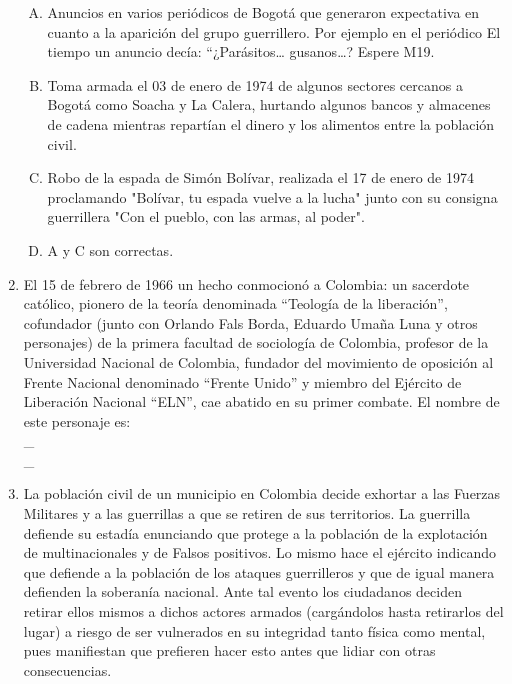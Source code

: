 \begin{enumerate}
\begin{enumerate}[(A)]
\item   Anuncios en varios periódicos de Bogotá que generaron expectativa en cuanto a la aparición del grupo guerrillero. Por ejemplo en el periódico El tiempo un anuncio decía: ``¿Parásitos… gusanos…? Espere M19.   
 \item  Toma armada el 03 de enero de 1974 de algunos sectores cercanos a Bogotá como Soacha y La Calera, hurtando algunos bancos y almacenes de cadena mientras repartían el dinero y los alimentos entre la población civil.
\item Robo de la espada de Simón Bolívar, realizada el 17 de enero de 1974 proclamando "Bolívar, tu espada vuelve a la lucha" junto con su consigna guerrillera "Con el pueblo, con las armas, al poder".
\item A y C son correctas.
\end{enumerate}



\item  El 15 de febrero de 1966 un hecho conmocionó a Colombia: un sacerdote católico, pionero de la teoría denominada ``Teología de la liberación'', cofundador (junto con Orlando Fals Borda, Eduardo Umaña Luna y otros personajes) de la primera facultad de sociología de Colombia, profesor de la Universidad Nacional de Colombia, fundador del movimiento de oposición al Frente Nacional denominado ``Frente Unido'' y miembro del Ejército de Liberación Nacional ``ELN'', cae abatido en su primer combate. El nombre de este personaje es:\label{sociii-11}
\hrulefill\\
\_\hrulefill\\
\_\hrulefill\\




\item La población civil de un municipio en Colombia decide exhortar a las Fuerzas Militares y a las guerrillas a que se retiren de sus territorios. La guerrilla defiende su estadía enunciando que protege a la población de la explotación de multinacionales y de Falsos positivos. Lo mismo hace el ejército indicando que defiende a la población de los ataques guerrilleros y que de igual manera defienden la soberanía nacional. Ante tal evento los ciudadanos deciden retirar ellos mismos a dichos actores armados (cargándolos hasta retirarlos del lugar) a riesgo de ser vulnerados en su integridad tanto física como mental, pues manifiestan que prefieren hacer esto antes que lidiar con otras consecuencias. \label{sociii-12}\\


\end{enumerate}
